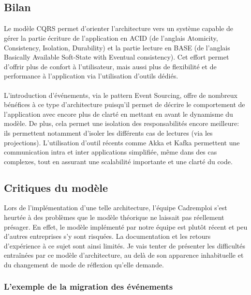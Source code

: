 \subsection{Bilan}
\paragraph{}
Le modèle CQRS permet d'orienter l'architecture vers un système capable de gérer la partie écriture de l'application en ACID (de l'anglais Atomicity, Consistency, Isolation, Durability) et la partie lecture en BASE (de l'anglais Basically Available Soft-State with Eventual consistency).
Cet effort permet d'offrir plus de confort à l'utilisateur, mais aussi plus de flexibilité et de performance à l'application via l'utilisation d'outils dédiés.
\paragraph{}
L'introduction d'événements, via le pattern Event Sourcing, offre de nombreux bénéfices à ce type d'architecture puisqu'il permet de décrire le comportement de l'application avec encore plus de clarté en mettant en avant le dynamisme du modèle.
De plus, cela permet une isolation des responsabilités encore meilleure: ils permettent notamment d'isoler les différents cas de lectures (via les projections).
L'utilisation d'outil récents comme Akka et Kafka permettent une communication intra et inter applications simplifiée, même dans des cas complexes, tout en assurant une scalabilité importante et une clarté du code.

\subsection{Critiques du modèle}
Lors de l'implémentation d'une telle architecture, l'équipe Cadremploi s'est heurtée à des problèmes que le modèle théorique ne laissait pas réellement présager.
En effet, le modèle implémenté par notre équipe est plutôt récent et peu d'autres entreprises s'y sont risquées.
La documentation et les retours d'expérience à ce sujet sont ainsi limités.
Je vais tenter de présenter les difficultés entraînées par ce modèle d'architecture, au delà de son apparence inhabituelle et du changement de mode de réflexion qu'elle demande.
\subsubsection{L'exemple de la migration des événements}
